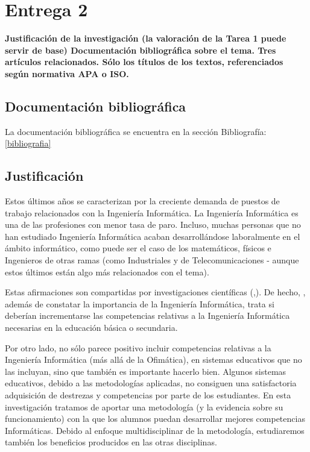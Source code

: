 \documentclass[palatino]{apuntesURJC}
\begin{document}
\chapter{Entrega 2}

\textbf{Justificación de la investigación (la valoración de la Tarea 1 puede servir de base)
%
Documentación bibliográfica sobre el tema.
%
Tres artículos relacionados. 
%
Sólo los títulos de los textos, referenciados según normativa APA o ISO.}

\section{Documentación bibliográfica}

La documentación bibliográfica se encuentra en la sección Bibliografía: \ref{bibliografia}

\section{Justificación}

Estos últimos años se caracterizan por la creciente demanda de puestos de trabajo relacionados con la Ingeniería Informática.
%
La Ingeniería Informática es una de las profesiones con menor tasa de paro. 
%
Incluso, muchas personas que no han estudiado Ingeniería Informática acaban desarrollándose laboralmente en el ámbito informático, como puede ser el caso de los matemáticos, físicos e Ingenieros de otras ramas (como Industriales y de Telecomunicaciones - aunque estos últimos están algo más relacionados con el tema).

Estas afirmaciones son compartidas por investigaciones científicas (\cite{CSIsImportant},\cite{CSArguing}). 
%
De hecho, \cite{CSArguing}, además de constatar la importancia de la Ingeniería Informática, trata si deberían incrementarse las competencias relativas a la Ingeniería Informática necesarias en la educación básica o secundaria.

Por otro lado, no sólo parece positivo incluir competencias relativas a la Ingeniería Informática (más allá de la Ofimática), en sistemas educativos que no las incluyan, sino que también es importante hacerlo bien.
%
Algunos sistemas educativos, debido a las metodologías aplicadas, no consiguen una satisfactoria adquisición de destrezas y competencias por parte de los estudiantes.
%
En esta investigación tratamos de aportar una metodología (y la evidencia sobre su funcionamiento) con la que los alumnos puedan desarrollar mejores competencias Informáticas. 
%
Debido al enfoque multidisciplinar de la metodología, estudiaremos también los beneficios producidos en las otras disciplinas.
\end{document}
